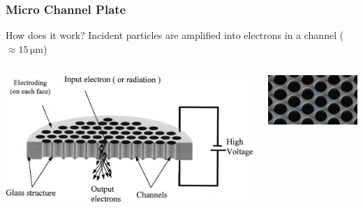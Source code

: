 \begin{frame}[t]
  \frametitle{Micro Channel Plate}
  \begin{block}{How does it work?}
    Incident particles are amplified into electrons in a channel ($\approx 15\,\mathrm{\mu m}$)
  \end{block}

  \begin{columns}[T]
    \begin{column}{0.45\textwidth}
      \begin{center}
        \includegraphics[width=1\textwidth]{03_SIM/fig/fig00_MCP_outline}
      \end{center}
    \end{column}
    \begin{column}{0.45\textwidth}
      \begin{center}
        \includegraphics[width=1\textwidth]{03_SIM/fig/fig000_MCP_outline_b2}
      \end{center}
    \end{column}
  \end{columns}


\end{frame}
